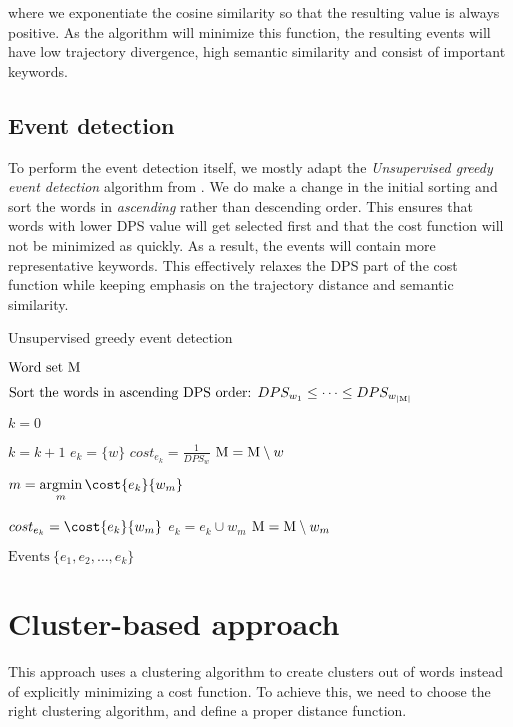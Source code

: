 where we exponentiate the cosine similarity so that the resulting value is always positive. As the algorithm will minimize this function, the resulting events will have low trajectory divergence, high semantic similarity and consist of important keywords.


\subsection{Event detection}
To perform the event detection itself, we mostly adapt the \textit{Unsupervised greedy event detection} algorithm from \cite{event-detection}. We do make a change in the initial sorting and sort the words in \textit{ascending} rather than descending order. This ensures that words with lower DPS value will get selected first and that the cost function will not be minimized as quickly. As a result, the events will contain more representative keywords. This effectively relaxes the DPS part of the cost function while keeping emphasis on the trajectory distance and semantic similarity.

\begin{algorithm}[H] \label{alg:greedy-event-detection}
\begin{algorithmic}[1]
\caption{Unsupervised greedy event detection}
\Input $\text{Word set} ~ \text{M}$

\State $\text{Sort the words in ascending DPS order: } DPS_{w_{1}} \leq \dots \leq DPS_{w_{\left\vert \text{M} \right\vert}}$

\State $k = 0$

	\State $k = k + 1$	
	\State $e_{k} = \{ w \}$
	\State $cost_{e_{k}} = \frac{1}{DPS_{w}}$
	\State $\text{M} = \text{M} \setminus w$
	
	\While{$\featset \neq \emptyset$}
		\State $m = \argmin\limits_{m}{\cost{e_{k}}{w_{m}}}$

			\State $cost_{e_{k}} = \cost{e_{k}}{w_{m}}$
			\State $e_{k} = e_{k} \cup w_{m}$
			\State $\text{M} = \text{M} \setminus w_{m}$
		\Else
			\Break
		\EndIf
	\EndWhile
\EndFor

\Output $\text{Events} ~ \{ e_{1}, e_{2}, \dots, e_{k} \}$
\end{algorithmic}
\end{algorithm}


\section{Cluster-based approach}
This approach uses a clustering algorithm to create clusters out of words instead of explicitly minimizing a cost function. To achieve this, we need to choose the right clustering algorithm, and define a proper distance function.

